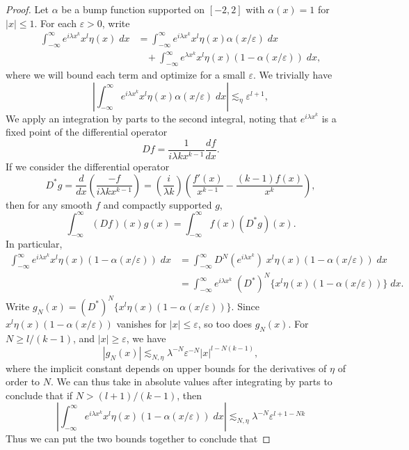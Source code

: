 \begin{proof}
  Let $\alpha$ be a bump function supported on $[-2,2]$ with $\alpha(x) = 1$ for $|x| \leq 1$. For each $\varepsilon > 0$, write
  \begin{align*}
    \int_{-\infty}^\infty e^{i \lambda x^k} x^l \eta(x)\; dx &= \int_{-\infty}^\infty e^{i \lambda x^k} x^l \eta(x) \alpha(x/\varepsilon)\; dx\\
    &\ \ \ \ + \int_{-\infty}^\infty e^{\lambda x^k} x^l \eta(x) (1 - \alpha(x/\varepsilon))\; dx,
  \end{align*}
  where we will bound each term and optimize for a small $\varepsilon$. We trivially have
  \[ \left| \int_{-\infty}^\infty e^{i \lambda x^k} x^l \eta(x) \alpha(x/\varepsilon)\; dx \right| \lesssim_\eta \varepsilon^{l+1}, \]
  We apply an integration by parts to the second integral, noting that $e^{i \lambda x^k}$ is a fixed point of the differential operator
  \[ Df = \frac{1}{i \lambda k x^{k-1}} \frac{df}{dx}. \]
  If we consider the differential operator
  \[ D^*g = \frac{d}{dx} \left( \frac{-f}{i \lambda k x^{k-1}} \right) = \left( \frac{i}{\lambda k} \right) \left( \frac{f'(x)}{x^{k-1}} - \frac{(k-1) f(x)}{x^k} \right), \]
  then for any smooth $f$ and compactly supported $g$,
  \[ \int_{-\infty}^\infty (Df)(x) g(x) = \int_{-\infty}^\infty f(x) (D^* g)(x). \]
  In particular,
  \begin{align*}
    \int_{-\infty}^\infty e^{i \lambda x^k} x^l \eta(x) (1 - \alpha(x/\varepsilon))\; dx &= \int_{-\infty}^\infty D^N(e^{i \lambda x^k})\; x^l \eta(x) (1 - \alpha(x/\varepsilon))\; dx\\
    &= \int_{-\infty}^\infty e^{i \lambda x^k}\; (D^*)^N \{ x^l \eta(x) (1 - \alpha(x/\varepsilon)) \}\; dx.
  \end{align*}
  Write $g_N(x) = (D^*)^N \{ x^l \eta(x) (1 - \alpha(x/\varepsilon)) \}$. Since $x^l \eta(x) (1 - \alpha(x/\varepsilon))$ vanishes for $|x| \leq \varepsilon$, so too does $g_N(x)$. For $N \geq l/(k-1)$, and $|x| \geq \varepsilon$, we have
  \[ |g_N(x)| \lesssim_{N,\eta} \lambda^{-N} \varepsilon^{-N} |x|^{l - N(k-1)}, \]
  where the implicit constant depends on upper bounds for the derivatives of $\eta$ of order to $N$. We can thus take in absolute values after integrating by parts to conclude that if $N > (l+1)/(k-1)$, then
  \[ \left| \int_{-\infty}^\infty e^{i \lambda x^k} x^l \eta(x) (1 - \alpha(x/\varepsilon))\; dx \right| \lesssim_{N,\eta} \lambda^{-N} \varepsilon^{l + 1 - Nk} \]
  Thus we can put the two bounds together to conclude that

\end{proof}
